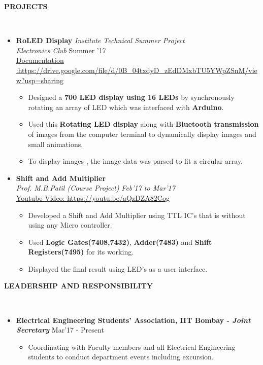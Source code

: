 \documentclass[a4paper,10pt]{article}
\newcommand{\isep}{-2 pt}
\newcommand{\lsep}{-0.5cm}
\newcommand{\resheading}[1]{{\small \colorbox{mygrey}{\begin{minipage}{0.975\textwidth}{\textbf{#1 \vphantom{p\^{E}}}}\end{minipage}}}}
\begin{document}
\resheading{\textbf{PROJECTS} }\\[\lsep]
\begin{itemize}
\item  \textbf{RoLED Display}  \hfill \hfill  \textsl{Institute Technical Summer Project}\\
 \emph{Electronics Club} \hfill \hfill Summer '17\\
 \href{https://drive.google.com/file/d/0B_04txdyD_zEdDMxbTU5YWpZSnM/view?usp=sharing}{Documentation :https://drive.google.com/file/d/0B_04txdyD_zEdDMxbTU5YWpZSnM/view?usp=sharing}
 \begin{itemize}\itemsep \isep
 \item Designed a \textbf{700 LED display using 16 LEDs} by synchronously rotating an array of LED which was interfaced with \textbf{Arduino}.
 \item Used this \textbf{Rotating LED display} along with \textbf{Bluetooth transmission} of images from the computer terminal to dynamically display images and small animations.
\item To display images , the image data was parsed to fit a circular array.
 \end{itemize}
\item \textbf{Shift and Add Multiplier} \\
 \emph{ Prof. M.B.Patil (Course Project)} \hfill {\em \emph{Feb'17 to Mar'17}}\\
 \href{https://youtu.be/aQzDZA82Cog}{Youtube Video: https://youtu.be/aQzDZA82Cog}
 \begin{itemize}\itemsep \isep
 \item Developed a Shift and Add Multiplier using TTL IC's that is without using any  Micro controller.
 \item Used \textbf{Logic Gates(7408,7432)}, \textbf{Adder(7483)} and \textbf{Shift Registers(7495)} for its working.
 \item Displayed the final result using LED's as a user interface.
 \end{itemize} 
\end{itemize}

\resheading{\textbf{LEADERSHIP AND RESPONSIBILITY} }\\[\lsep]
\begin{itemize}

\item \textbf{Electrical Engineering Students' Association, IIT Bombay - \emph{Joint Secretary}
}  \hfill { Mar'17 - Present} \\[-0.6cm]
	\begin{itemize}\itemsep \isep
	\item Coordinating with Faculty members and all Electrical Engineering students to conduct department events including excursion.

	\end{itemize}
\end{itemize}
\end{document}
